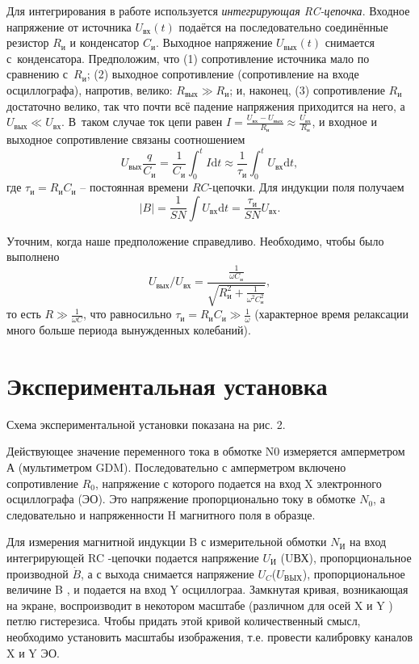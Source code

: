 \documentclass[a4paper]{article}
\begin{document}
Для интегрирования в работе используется \textit{интегрирующая RC-цепочка}.
Входное напряжение от источника $U_{\text{вх}}(t)$ подаётся на последовательно соединённые резистор $R_{\text{и}}$ и конденсатор $C_{\text{и}}$.
Выходное напряжение $U_{\text{вых}}(t)$ снимается с~конденсатора.
Предположим, что (1) сопротивление источника мало по сравнению с~$R_{\text{и}}$;
(2) выходное сопротивление (сопротивление на входе осциллографа), напротив, велико:
$R_{\text{вых}}\gg R_{\text{и}}$; и, наконец, (3) сопротивление $R_{\text{и}}$ достаточно велико,
так что почти всё падение напряжения приходится на него, а $U_{\text{вых}}\ll U_{\text{вх}}$.
В~таком случае ток цепи равен $I=\frac{U_{\text{вх}}-U_{\text{вых}}}{R_{\text{и}}}\approx\frac{U_{\text{вх}}}{R_{\text{и}}}$,
и входное и выходное сопротивление связаны соотношением\[U_{\text{вых}}\frac{q}{C_{\text{и}}}=\frac{1}{C_{\text{и}}}\int_0^tI\text{d}t\approx\frac{1}{\tau_{\text{и}}}\int_0^tU_{\text{вх}}\text{d}t,\]где $\tau_{\text{и}}=R_{\text{и}}C_{\text{и}}$ -- постоянная времени $RC$-цепочки.
Для индукции поля получаем\[\left|B\right|=\frac{1}{SN}\int U_{\text{вх}}\text{d}t=\frac{\tau_{\text{и}}}{SN}U_{\text{вх}}.\]

Уточним, когда наше предположение справедливо. Необходимо, чтобы было выполнено \[U_\text{вых} / U_\text{вх} = \frac{\frac{1}{\omega C_\text{и}}}{\sqrt{R_\text{и}^2 + \frac{1}{\omega^2 C_\text{и}^2}}},\]
то есть $R \gg \frac{1}{\omega C}$, что равносильно $\tau_\text{и} = R_\text{и}C_\text{и} \gg \frac{1}{\omega}$ (характерное время релаксации много больше периода вынужденных колебаний).

\section{Экспериментальная установка}

Схема экспериментальной установки показана на рис. 2.
	
	Действующее значение переменного тока в обмотке N0 измеряется амперметром А (мультиметром GDM). Последовательно с амперметром включено сопротивление $R_{0}$, напряжение с которого подается на вход X электронного осциллографа (ЭО). Это напряжение пропорционально току в обмотке $N_{0}$, а следовательно и напряженности H магнитного поля в образце.
	
	Для измерения магнитной индукции B с измерительной обмотки $N_{И}$ на вход интегрирующей RC -цепочки подается напряжение $U_{И}$ (UВХ), пропорциональное производной $\dot{B}$, а с выхода снимается напряжение $U_{C}$($U_{ВЫХ}$), пропорциональное
	величине B , и подается на вход Y осциллограа.
Замкнутая кривая, возникающая на экране, воспроизводит в некотором масштабе (различном для осей X и Y ) петлю гистерезиса. Чтобы придать этой кривой количественный смысл, необходимо установить масштабы изображения, т.е. провести калибровку каналов X и Y ЭО.
\end{document}
